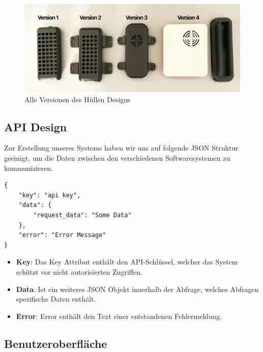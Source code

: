 \documentclass[../main.tex]{subfiles}
\begin{document}
\begin{figure}[!ht]
    \includegraphics[width=\linewidth]{images/huellen_versionen.png}
    \caption{Alle Versionen des Hüllen Designs}
    \centering
\end{figure}

\subsection{API Design} \label{JSON-API}

Zur Erstellung unseres Systems haben wir uns auf folgende JSON Struktur geeinigt, um die Daten zwischen den verschiedenen Softwaresystemen zu kommunizieren. 

\begin{lstlisting}
{
    "key": "api key",
    "data": {
        "request_data": "Some Data"
    },
    "error": "Error Message"
}
\end{lstlisting}

\begin{itemize}
  \item\textbf{Key}: Das Key Attribut enthält den API-Schlüssel, welcher das System schützt vor nicht autorisierten Zugriffen.
  \item\textbf{Data}: Ist ein weiteres JSON Objekt innerhalb der Abfrage, welches Abfragen spezifische Daten enthält.
  \item\textbf{Error}: Error enthält den Text einer entstandenen Fehlermeldung.
\end{itemize}

\subsection{Benutzeroberfläche}
\end{document}
